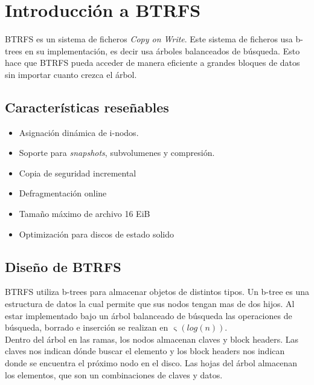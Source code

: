 \section{Introducción a BTRFS}
BTRFS es un sistema de ficheros \textit{Copy on Write}. Este sistema de ficheros usa b-trees en su implementación, es decir usa árboles balanceados de búsqueda. Esto hace que BTRFS pueda acceder de manera eficiente a grandes bloques de datos sin importar cuanto crezca el árbol.

\subsection{Características reseñables}
\begin{itemize}
    \item Asignación dinámica de i-nodos.
    \item Soporte para \textit{snapshots}, subvolumenes y compresión.
    \item Copia de seguridad incremental
    \item Defragmentación online
    \item Tamaño máximo de archivo 16 EiB 
    \item Optimización para discos de estado solido
\end{itemize}

\subsection{Diseño de BTRFS}
BTRFS utiliza b-trees para almacenar objetos de distintos tipos. Un b-tree es una estructura de datos la cual permite que sus nodos tengan mas de dos hijos. Al estar implementado bajo un árbol balanceado de búsqueda las operaciones de búsqueda, borrado e inserción se realizan en
\begin{math}
\mathrm{\upvarsigma}(log(n)).
\end{math}
\cite{henson}
\\

Dentro del árbol en las ramas, los nodos almacenan claves y block headers. Las claves nos indican dónde buscar el elemento y los block headers nos indican donde se encuentra el próximo nodo en el disco.
Las hojas del árbol almacenan los elementos, que son un combinaciones de claves y datos.
\\

